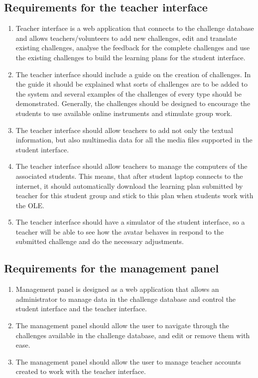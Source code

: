 \documentclass[a4paper]{article}
\begin{document}
\subsection{Requirements for the teacher interface}

\begin{enumerate}
\item Teacher interface is a web application that connects to the challenge database and allows teachers/volunteers to add new challenges, edit and translate existing challenges, analyse the feedback for the complete challenges and use the existing challenges to build the learning plans for the student interface.

\item The teacher interface should include a guide on the creation of challenges. In the guide it should be explained what sorts of challenges are to be added to the system and several examples of the challenges of every type should be demonstrated. Generally, the challenges should be designed to encourage the students to use available online instruments and stimulate group work.

\item The teacher interface should allow teachers to add not only the textual information, but also multimedia data for all the media files supported in the student interface.

\item The teacher interface should allow teachers to manage the computers of the associated students. This means, that after student laptop connects to the internet, it should automatically download the learning plan submitted by teacher for this student group and stick to this plan when students work with the OLE.

\item The teacher interface should have a simulator of the student interface, so a teacher will be able to see how the avatar behaves in respond to the submitted challenge and do the necessary adjustments.
\end{enumerate}


\subsection{Requirements for the management panel}

\begin{enumerate}
\item Management panel is designed as a web application that allows an administrator to manage data in the challenge database and control the student interface and the teacher interface. 

\item The management panel should allow the user to navigate through the challenges available in the challenge database, and edit or remove them with ease.

\item The management panel should allow the user to manage teacher accounts created to work with the teacher interface.
\end{enumerate}
\end{document}
